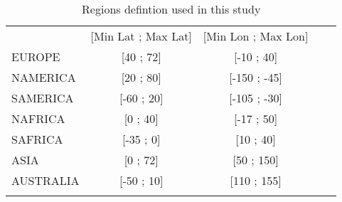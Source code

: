 \documentclass[journal abbreviation, manuscript]{copernicus}
\begin{document}
\clearpage
\begin{table}
\caption{Regions defintion used in this study}
 \begin{tabular}{lcccc}
  \tophline
                     & [Min Lat ; Max Lat] & [Min Lon ; Max Lon] \\
  \middlehline
  EUROPE    & [40 ; 72] & [-10 ; 40]      \\
  NAMERICA    & [20 ; 80] & [-150 ; -45]      \\
  SAMERICA    & [-60 ; 20] & [-105 ; -30]      \\
  NAFRICA    & [0 ; 40] & [-17 ; 50]      \\
  SAFRICA    & [-35 ; 0] & [10 ; 40]      \\
  ASIA    & [0 ; 72] & [50 ; 150]      \\
  AUSTRALIA    & [-50 ; 10] & [110 ; 155]      \\
  \bottomhline
 \end{tabular}
 \label{table:reg_def}
\end{table}
\end{document}
